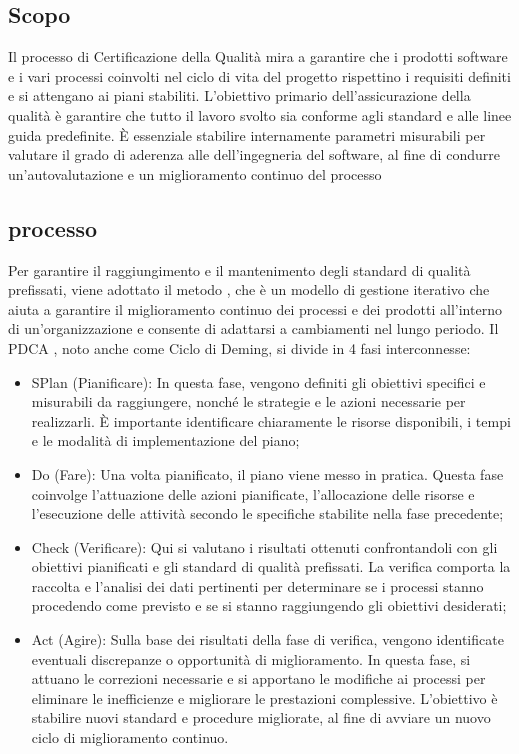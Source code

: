 \subsection{Scopo}
Il processo di Certificazione della Qualità mira a garantire che i prodotti software e i vari processi coinvolti nel ciclo di vita del progetto rispettino i requisiti definiti e si attengano ai piani stabiliti. L'obiettivo primario dell'assicurazione della qualità è garantire che tutto il lavoro svolto sia conforme agli standard e alle linee guida predefinite. È essenziale stabilire internamente parametri misurabili per valutare il grado di aderenza alle  dell'ingegneria del software, al fine di condurre un'autovalutazione e un miglioramento continuo del processo

\subsection{processo}

Per garantire il raggiungimento e il mantenimento degli standard di qualità prefissati, viene adottato il metodo , che è un modello di gestione iterativo che aiuta a garantire il miglioramento continuo dei processi e dei prodotti all'interno di un'organizzazione e consente di adattarsi a cambiamenti nel lungo periodo. Il PDCA , noto anche come Ciclo di Deming, si divide in 4 fasi interconnesse:

\begin{itemize}
    \item SPlan (Pianificare): In questa fase, vengono definiti gli obiettivi specifici e misurabili da raggiungere, nonché le strategie e le azioni necessarie per realizzarli. È importante identificare chiaramente le risorse disponibili, i tempi e le modalità di implementazione del piano;
    \item Do (Fare): Una volta pianificato, il piano viene messo in pratica. Questa fase coinvolge l'attuazione delle azioni pianificate, l'allocazione delle risorse e l'esecuzione delle attività secondo le specifiche stabilite nella fase precedente;
    \item Check (Verificare): Qui si valutano i risultati ottenuti confrontandoli con gli obiettivi pianificati e gli standard di qualità prefissati. La verifica comporta la raccolta e l'analisi dei dati pertinenti per determinare se i processi stanno procedendo come previsto e se si stanno raggiungendo gli obiettivi desiderati;
    \item Act (Agire): Sulla base dei risultati della fase di verifica, vengono identificate eventuali discrepanze o opportunità di miglioramento. In questa fase, si attuano le correzioni necessarie e si apportano le modifiche ai processi per eliminare le inefficienze e migliorare le prestazioni complessive. L'obiettivo è stabilire nuovi standard e procedure migliorate, al fine di avviare un nuovo ciclo di miglioramento continuo.
\end{itemize}

